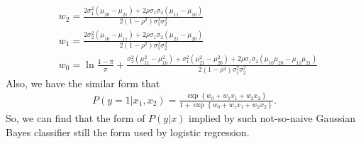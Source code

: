 \documentclass[UTF8,12pt, a4paper]{ctexart}
\begin{document}
\begin{tcolorbox}
\begin{align*}
  &w_2 = 
  \frac{
      2 \sigma_1^2(\mu_{20} - \mu_{21})
      + 2\rho\sigma_1\sigma_2(\mu_{11}-\mu_{10})
    }{
      2(1-\rho^2)\sigma_1^2\sigma_2^2
  } \\
  &w_1 = 
  \frac{
    2 \sigma_2^2(\mu_{10} - \mu_{11})
    + 2\rho\sigma_1\sigma_2(\mu_{21}-\mu_{20})
  }{
    2(1-\rho^2)\sigma_1^2\sigma_2^2
  }\\
  &w_0 = 
  \ln \frac{
    1-\pi
  }{
    \pi
  } + 
  \frac{
    \sigma_2^2(\mu_{11}^2 - \mu_{10}^2)
    + \sigma_1^2(\mu_{21}^2 - \mu_{20}^2)
    + 2\rho\sigma_1\sigma_2(\mu_{10}\mu_{20}-\mu_{11}\mu_{21})
  }{
    2(1-\rho^2)\sigma_1^2\sigma_2^2
  }
\end{align*}
Also, we have the similar form that
\begin{align}
  P(y=1|x_1,x_2)=\frac{
    \exp\left\{
      w_0+ w_1x_1 + w_2x_2
    \right\}
  }{
    1+
    \exp\left\{
      w_0+ w_1x_1 + w_2x_2
    \right\}
  }.
\end{align}
{\color{red}So, we can find that the form of $P(y|x)$ implied by such not-so-naive Gaussian Bayes classifier still the form used by logistic regression.}
\end{tcolorbox}
\end{document}
